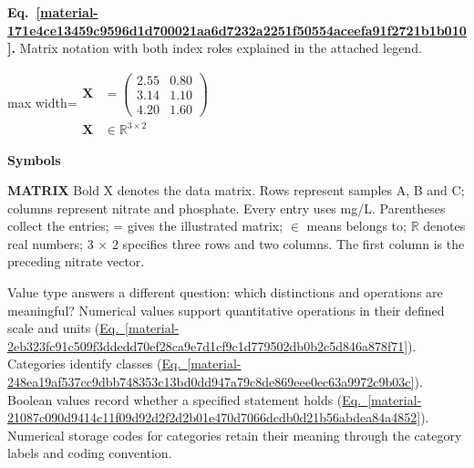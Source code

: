 \documentclass[11pt,a4paper]{article}
\begin{document}
\par\medskip
\noindent\begin{minipage}{\linewidth}
\label{material-171e4ce13459c9596d1d700021aa6d7232a2251f50554aceefa91f2721b1b010}
\noindent\textbf{Eq.~\ref*{material-171e4ce13459c9596d1d700021aa6d7232a2251f50554aceefa91f2721b1b010}.} Matrix notation with both index roles explained in the attached legend.\par\nopagebreak
\begin{center}\begin{adjustbox}{max width=\linewidth}$\displaystyle \begin{aligned}\mathbf{X} &= \begin{pmatrix}2.55 & 0.80\\3.14 & 1.10\\4.20 & 1.60\end{pmatrix}\\ \mathbf{X} &\in \mathbb{R}^{3\times2}\end{aligned}$\end{adjustbox}\end{center}

\par\noindent\textbf{Symbols}

\par\noindent\textbf{MATRIX} Bold X denotes the data matrix. Rows represent samples A, B and C; columns represent nitrate and phosphate. Every entry uses mg/L. Parentheses collect the entries; = gives the illustrated matrix; \ensuremath{\in} means belongs to; \ensuremath{\mathbb{R}} denotes real numbers; 3 \ensuremath{\times} 2 specifies three rows and two columns. The first column is the preceding nitrate vector.

\end{minipage}\par
\medskip

Value type answers a different question: which distinctions and operations are meaningful? Numerical values support quantitative operations in their defined scale and units (\hyperref[material-2eb323fc91c509f3ddedd70ef28ca9e7d1cf9c1d779502db0b2c5d846a878f71]{Eq.~\ref*{material-2eb323fc91c509f3ddedd70ef28ca9e7d1cf9c1d779502db0b2c5d846a878f71}}). Categories identify classes (\hyperref[material-248ea19af537cc9dbb748353c13bd0dd947a79c8de869eee0ec63a9972c9b03c]{Eq.~\ref*{material-248ea19af537cc9dbb748353c13bd0dd947a79c8de869eee0ec63a9972c9b03c}}). Boolean values record whether a specified statement holds (\hyperref[material-21087c090d9414c11f09d92d2f2d2b01e470d7066dcdb0d21b56abdea84a4852]{Eq.~\ref*{material-21087c090d9414c11f09d92d2f2d2b01e470d7066dcdb0d21b56abdea84a4852}}). Numerical storage codes for categories retain their meaning through the category labels and coding convention.
\end{document}
